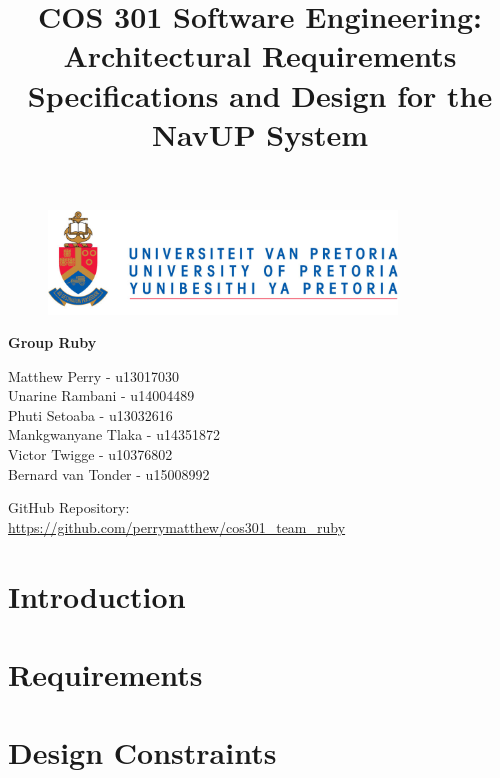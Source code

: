 \documentclass{article}
\begin{document}
		\begin{figure}[t]
			\centering
			\includegraphics[width=350px]{UP_Logo.PNG}
		\end{figure}
			\title{COS 301 Software Engineering: Architectural Requirements Specifications and Design for the NavUP System}
\maketitle
		\begin{center}
			\textbf{\newline Group Ruby} \\
		\end{center}
			
				
		\begin{flushright} \large
			Matthew Perry - u13017030 \\
			Unarine Rambani - u14004489  \\
			Phuti Setoaba -  u13032616\\
			Mankgwanyane Tlaka - u14351872  \\
			Victor Twigge -  u10376802\\
			Bernard van Tonder - u15008992  \\
		\end{flushright}
		
		
		
		
		GitHub Repository: \href{https://github.com/perrymatthew/cos301_team_ruby}\\
		\url{https://github.com/perrymatthew/cos301_team_ruby}
	

\clearpage
\tableofcontents
\clearpage
\section{Introduction}
	
\clearpage
\section{Requirements}
	
\section{Design Constraints}
	
\end{document}
